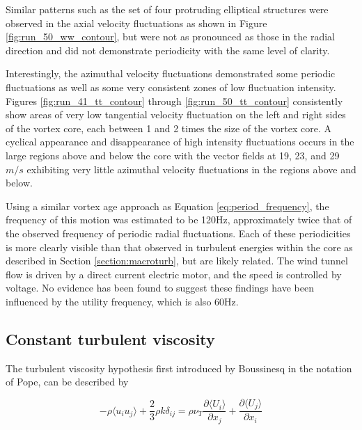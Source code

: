 Similar patterns such as the set of four protruding elliptical structures were 
observed in the axial velocity fluctuations as shown in 
Figure \ref{fig:run_50_ww_contour}, but were not as pronounced as those in the 
radial direction and did not demonstrate periodicity with the same level of 
clarity.



Interestingly, the azimuthal velocity fluctuations demonstrated some
periodic fluctuations as well as some very consistent zones of low fluctuation 
intensity.
Figures \ref{fig:run_41_tt_contour} through \ref{fig:run_50_tt_contour} 
consistently show areas of very low tangential velocity fluctuation on the left 
and right sides of the vortex core, each between 1 and 2 times the size of the 
vortex core. A cyclical appearance and disappearance of high intensity 
fluctuations occurs in the large regions above and below the core with the 
vector fields at 19, 23, and 29 $m/s$ exhibiting very little azimuthal velocity 
fluctuations in the regions above and below.












Using a similar vortex age approach as Equation \ref{eq:period_frequency}, the 
frequency of this motion was estimated to be 120Hz, approximately twice that of 
the observed frequency of periodic radial fluctuations. Each of these 
periodicities is more clearly visible than that observed in turbulent energies 
within the core as described in Section \ref{section:macroturb}, but are likely 
related. The wind tunnel flow is driven by a direct current electric motor, and 
the speed is controlled by voltage. No evidence has been found to suggest these 
findings have been influenced by the utility frequency, which is also 60Hz.

\subsection{Constant turbulent viscosity}
The turbulent viscosity hypothesis first introduced by 
Boussinesq \cite{pope2000} in the notation of Pope, can be described by

\begin{equation}
-\rho \langle u_i u_j \rangle + \frac{2}{3}\rho k \delta_{ij} = \rho \nu_T
\frac{\partial \langle U_i \rangle}{\partial x_j} + \frac{\partial \langle U_j 
\rangle}{\partial x_i}
\end{equation} 

